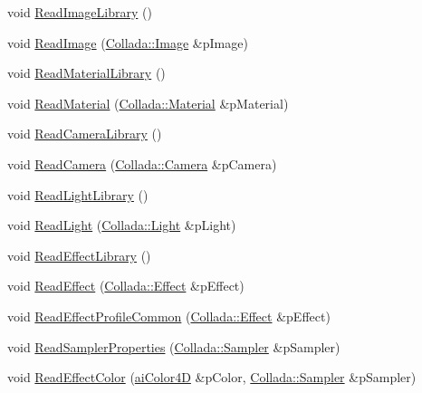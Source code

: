 \begin{DoxyCompactItemize}
\item 
void \hyperlink{class_assimp_1_1_collada_parser_a41c9d5f640ea750fa7385fbec6ee98ad}{Read\+Image\+Library} ()
\item 
void \hyperlink{class_assimp_1_1_collada_parser_ad078882d986da195433443a017f8a9b4}{Read\+Image} (\hyperlink{struct_assimp_1_1_collada_1_1_image}{Collada\+::\+Image} \&p\+Image)
\item 
void \hyperlink{class_assimp_1_1_collada_parser_ab2b90003b26f3a5b3537625f6a754508}{Read\+Material\+Library} ()
\item 
void \hyperlink{class_assimp_1_1_collada_parser_a0fa365cfc4907a9b3ffe8a0ca119fb5f}{Read\+Material} (\hyperlink{struct_assimp_1_1_collada_1_1_material}{Collada\+::\+Material} \&p\+Material)
\item 
void \hyperlink{class_assimp_1_1_collada_parser_ad71f311f965c39f935a80b6dcac5dfdb}{Read\+Camera\+Library} ()
\item 
void \hyperlink{class_assimp_1_1_collada_parser_a4ea0767990fd3e1060444dda2c49e078}{Read\+Camera} (\hyperlink{struct_assimp_1_1_collada_1_1_camera}{Collada\+::\+Camera} \&p\+Camera)
\item 
void \hyperlink{class_assimp_1_1_collada_parser_a3ed3dbf44b1cff5bef102b650af346e6}{Read\+Light\+Library} ()
\item 
void \hyperlink{class_assimp_1_1_collada_parser_a28db9d9859f8bb5aeae38eab4af46385}{Read\+Light} (\hyperlink{struct_assimp_1_1_collada_1_1_light}{Collada\+::\+Light} \&p\+Light)
\item 
void \hyperlink{class_assimp_1_1_collada_parser_a39a241eb37d2b45fe1b04cfb755b4afc}{Read\+Effect\+Library} ()
\item 
void \hyperlink{class_assimp_1_1_collada_parser_a64921d31969c8c90729ecafcdc8d1cbb}{Read\+Effect} (\hyperlink{struct_assimp_1_1_collada_1_1_effect}{Collada\+::\+Effect} \&p\+Effect)
\item 
void \hyperlink{class_assimp_1_1_collada_parser_ae2970e21c607b0f6b9fe42c8536f0442}{Read\+Effect\+Profile\+Common} (\hyperlink{struct_assimp_1_1_collada_1_1_effect}{Collada\+::\+Effect} \&p\+Effect)
\item 
void \hyperlink{class_assimp_1_1_collada_parser_a8a57d9126cf0907adf1abb6d58040ab2}{Read\+Sampler\+Properties} (\hyperlink{struct_assimp_1_1_collada_1_1_sampler}{Collada\+::\+Sampler} \&p\+Sampler)
\item 
void \hyperlink{class_assimp_1_1_collada_parser_ac612c933ce6683da5eec958a76a31ca2}{Read\+Effect\+Color} (\hyperlink{structai_color4_d}{ai\+Color4\+D} \&p\+Color, \hyperlink{struct_assimp_1_1_collada_1_1_sampler}{Collada\+::\+Sampler} \&p\+Sampler)

\end{DoxyCompactItemize}
